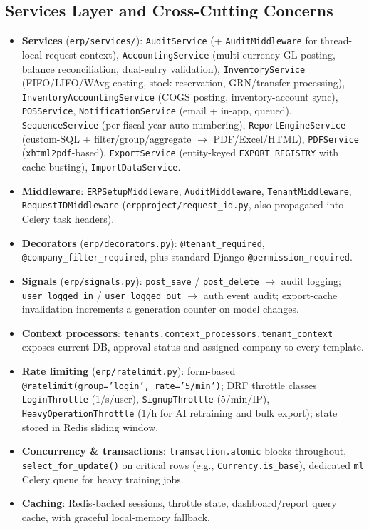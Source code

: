 \documentclass[12pt,a4paper]{report}
\begin{document}
\subsection{Services Layer and Cross-Cutting Concerns}
\begin{itemize}
  \item \textbf{Services} (\texttt{erp/services/}): \texttt{AuditService} (+ \texttt{AuditMiddleware} for thread-local request context), \texttt{AccountingService} (multi-currency GL posting, balance reconciliation, dual-entry validation), \texttt{InventoryService} (FIFO/LIFO/WAvg costing, stock reservation, GRN/transfer processing), \texttt{InventoryAccountingService} (COGS posting, inventory-account sync), \texttt{POSService}, \texttt{NotificationService} (email + in-app, queued), \texttt{SequenceService} (per-fiscal-year auto-numbering), \texttt{ReportEngineService} (custom-SQL + filter/group/aggregate $\to$ PDF/Excel/HTML), \texttt{PDFService} (\texttt{xhtml2pdf}-based), \texttt{ExportService} (entity-keyed \texttt{EXPORT\_REGISTRY} with cache busting), \texttt{ImportDataService}.
  \item \textbf{Middleware}: \texttt{ERPSetupMiddleware}, \texttt{AuditMiddleware}, \texttt{TenantMiddleware}, \texttt{RequestIDMiddleware} (\texttt{erpproject/request\_id.py}, also propagated into Celery task headers).
  \item \textbf{Decorators} (\texttt{erp/decorators.py}): \texttt{@tenant\_required}, \texttt{@company\_filter\_required}, plus standard Django \texttt{@permission\_required}.
  \item \textbf{Signals} (\texttt{erp/signals.py}): \texttt{post\_save} / \texttt{post\_delete} $\to$ audit logging; \texttt{user\_logged\_in} / \texttt{user\_logged\_out} $\to$ auth event audit; export-cache invalidation increments a generation counter on model changes.
  \item \textbf{Context processors}: \texttt{tenants.context\_processors.tenant\_context} exposes current DB, approval status and assigned company to every template.
  \item \textbf{Rate limiting} (\texttt{erp/ratelimit.py}): form-based \texttt{@ratelimit(group='login', rate='5/min')}; DRF throttle classes \texttt{LoginThrottle} (1/s/user), \texttt{SignupThrottle} (5/min/IP), \texttt{HeavyOperationThrottle} (1/h for AI retraining and bulk export); state stored in Redis sliding window.
  \item \textbf{Concurrency \& transactions}: \texttt{transaction.atomic} blocks throughout, \texttt{select\_for\_update()} on critical rows (e.g., \texttt{Currency.is\_base}), dedicated \texttt{ml} Celery queue for heavy training jobs.
  \item \textbf{Caching}: Redis-backed sessions, throttle state, dashboard/report query cache, with graceful local-memory fallback.
\end{itemize}
\end{document}
